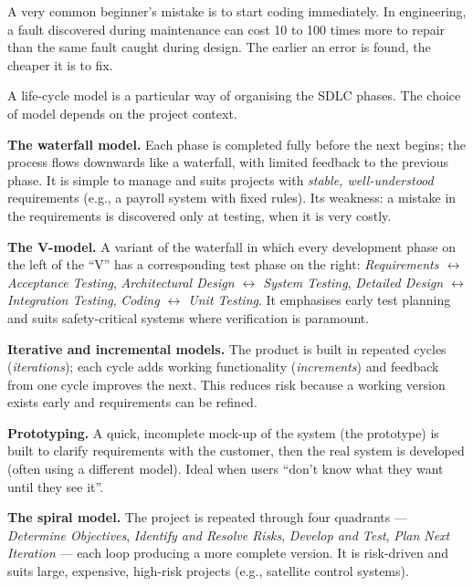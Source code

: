 \documentclass[11pt]{article}
\newcommand{\cle}[1]{{\popxbold\color{popdark}#1}}
\newcounter{popsec}
\newcounter{popsub}
\newcommand{\courssub}[1]{%
  \stepcounter{popsub}%
  \par\vspace{9pt}\noindent{\popxbold\fontsize{11.5}{13}\selectfont\color{popink}{\color{poporange}\thepopsec.\thepopsub}\hspace{6pt}#1}\par\nopagebreak\vspace{4pt}
}
\begin{document}
\begin{attention}
A very common beginner's mistake is to start coding immediately. In engineering, a fault discovered during maintenance can cost 10 to 100 times more to repair than the same fault caught during design. The earlier an error is found, the cheaper it is to fix.
\end{attention}

\courssub{Life-Cycle Models Compared}

A \cle{life-cycle model} is a particular way of organising the SDLC phases. The choice of model depends on the project context.

\textbf{The waterfall model.} Each phase is completed fully before the next begins; the process flows downwards like a waterfall, with limited feedback to the previous phase. It is simple to manage and suits projects with \emph{stable, well-understood} requirements (e.g., a payroll system with fixed rules). Its weakness: a mistake in the requirements is discovered only at testing, when it is very costly.

\textbf{The V-model.} A variant of the waterfall in which every development phase on the left of the ``V'' has a corresponding test phase on the right: \emph{Requirements $\leftrightarrow$ Acceptance Testing}, \emph{Architectural Design $\leftrightarrow$ System Testing}, \emph{Detailed Design $\leftrightarrow$ Integration Testing}, \emph{Coding $\leftrightarrow$ Unit Testing}. It emphasises early test planning and suits safety-critical systems where verification is paramount.

\textbf{Iterative and incremental models.} The product is built in repeated cycles (\emph{iterations}); each cycle adds working functionality (\emph{increments}) and feedback from one cycle improves the next. This reduces risk because a working version exists early and requirements can be refined.

\textbf{Prototyping.} A quick, incomplete mock-up of the system (the prototype) is built to clarify requirements with the customer, then the real system is developed (often using a different model). Ideal when users ``don't know what they want until they see it''.

\textbf{The spiral model.} The project is repeated through four quadrants — \emph{Determine Objectives}, \emph{Identify and Resolve Risks}, \emph{Develop and Test}, \emph{Plan Next Iteration} — each loop producing a more complete version. It is risk-driven and suits large, expensive, high-risk projects (e.g., satellite control systems).
\end{document}
